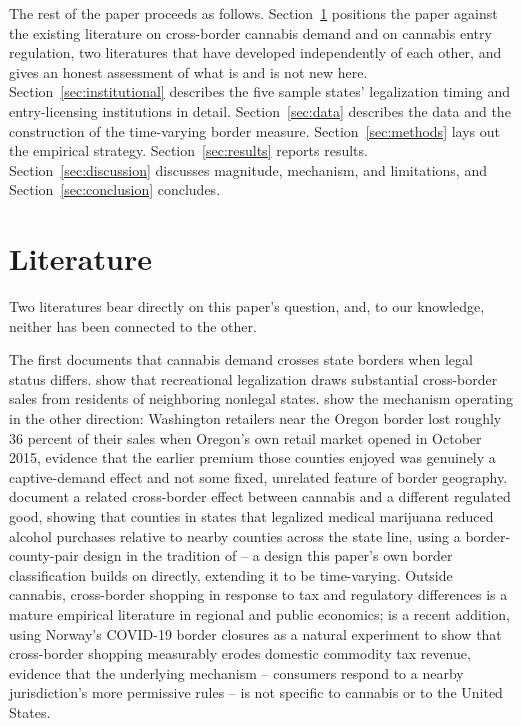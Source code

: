 \documentclass[12pt]{article}
\begin{document}
The rest of the paper proceeds as follows. Section~\ref{sec:lit} positions the paper against the existing
literature on cross-border cannabis demand and on cannabis entry regulation, two literatures that have
developed independently of each other, and gives an honest assessment of what is and is not new here.
Section~\ref{sec:institutional} describes the five sample states' legalization timing and entry-licensing
institutions in detail. Section~\ref{sec:data} describes the data and the construction of the time-varying
border measure. Section~\ref{sec:methods} lays out the empirical strategy. Section~\ref{sec:results} reports
results. Section~\ref{sec:discussion} discusses magnitude, mechanism, and limitations, and
Section~\ref{sec:conclusion} concludes.

\section{Literature}
\label{sec:lit}

Two literatures bear directly on this paper's question, and, to our knowledge, neither has been connected to
the other.

The first documents that cannabis demand crosses state borders when legal status differs. \citet{HaoCowan2020}
show that recreational legalization draws substantial cross-border sales from residents of neighboring
nonlegal states. \citet{HansenMillerWeber2020} show the mechanism operating in the other direction: Washington
retailers near the Oregon border lost roughly 36 percent of their sales when Oregon's own retail market opened
in October 2015, evidence that the earlier premium those counties enjoyed was genuinely a captive-demand effect
and not some fixed, unrelated feature of border geography. \citet{BaggioChongKwon2020} document a related
cross-border effect between cannabis and a different regulated good, showing that counties in states that
legalized medical marijuana reduced alcohol purchases relative to nearby counties across the state line, using
a border-county-pair design in the tradition of \citet{DubeLesterReich2010} -- a design this paper's own border
classification builds on directly, extending it to be time-varying. Outside cannabis, cross-border shopping in
response to tax and regulatory differences is a mature empirical literature in regional and public economics;
\citet{FribergEtAl2024} is a recent addition, using Norway's COVID-19 border closures as a natural experiment
to show that cross-border shopping measurably erodes domestic commodity tax revenue, evidence that the
underlying mechanism -- consumers respond to a nearby jurisdiction's more permissive rules -- is not specific
to cannabis or to the United States.
\end{document}
